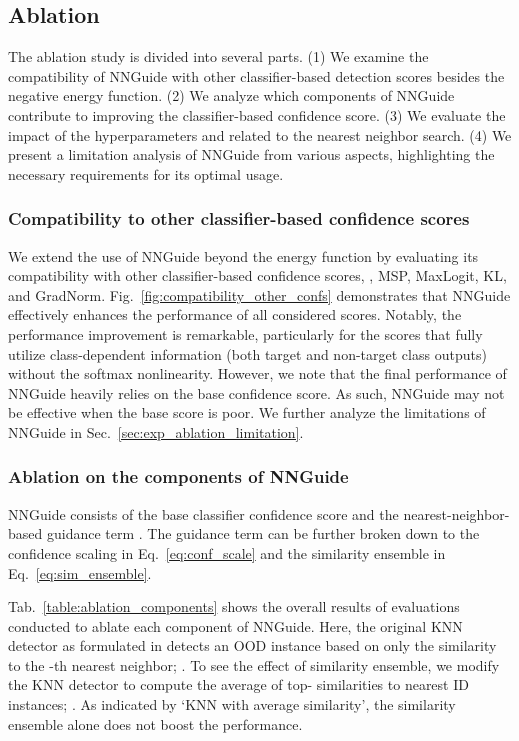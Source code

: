 \documentclass[10pt,twocolumn,letterpaper]{article}
\begin{document}
\subsection{Ablation}


The ablation study is divided into several parts. (1) We examine the compatibility of NNGuide with other classifier-based detection scores besides the negative energy function. (2) We analyze which components of NNGuide contribute to improving the classifier-based confidence score. (3) We evaluate the impact of the hyperparameters  and  related to the nearest neighbor search. (4) We present a limitation analysis of NNGuide from various aspects, highlighting the necessary requirements for its optimal usage.

\subsubsection{Compatibility to other classifier-based confidence scores}



We extend the use of NNGuide beyond the energy function by evaluating its compatibility with other classifier-based confidence scores, \ie, MSP, MaxLogit, KL, and GradNorm. Fig.~\ref{fig:compatibility_other_confs} demonstrates that NNGuide effectively enhances the performance of all considered scores.
Notably, the performance improvement is remarkable, particularly for the scores that fully utilize class-dependent information (both target and non-target class outputs) without the softmax nonlinearity. However, we note that the final performance of NNGuide heavily relies on the base confidence score. As such, NNGuide may not be effective when the base score is poor. We further analyze the limitations of NNGuide in Sec.~\ref{sec:exp_ablation_limitation}.


\subsubsection{Ablation on the components of NNGuide}
NNGuide consists of the base classifier confidence score  and the nearest-neighbor-based guidance term . The guidance term can be further broken down to the confidence scaling in Eq.~\eqref{eq:conf_scale} and the similarity ensemble in Eq.~\eqref{eq:sim_ensemble}.

Tab.~\ref{table:ablation_components} shows the overall results of evaluations conducted to ablate each component of NNGuide. Here, the original KNN detector as formulated in \cite{sun2022out} detects an OOD instance based on only the similarity to the -th nearest neighbor; \ie . To see the effect of similarity ensemble, we modify the KNN detector to compute the average of top- similarities to nearest ID instances; \ie .
As indicated by `KNN with average similarity', the similarity ensemble alone does not boost the performance. 
\end{document}
